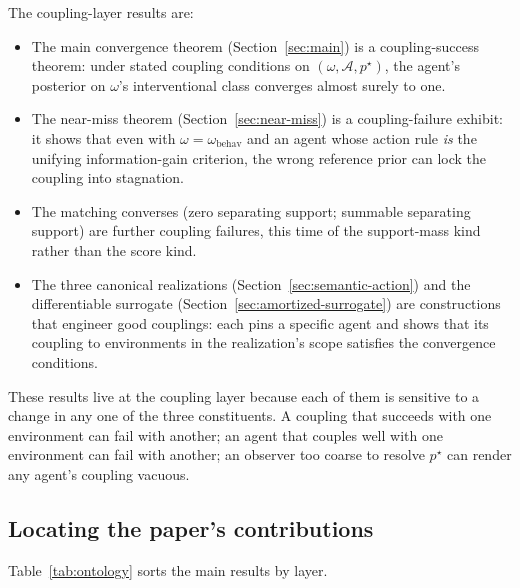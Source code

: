 \documentclass[11pt]{article}
\theoremstyle{definition}
\theoremstyle{remark}
\newcommand{\Acal}{\mathcal{A}}
\begin{document}
The coupling-layer results are:
\begin{itemize}
\item The main convergence theorem (Section~\ref{sec:main}) is a coupling-success theorem: under stated coupling conditions on $(\omega,\Acal,p^\star)$, the agent's posterior on $\omega$'s interventional class converges almost surely to one.
\item The near-miss theorem (Section~\ref{sec:near-miss}) is a coupling-failure exhibit: it shows that even with $\omega=\omega_{\mathrm{behav}}$ and an agent whose action rule \emph{is} the unifying information-gain criterion, the wrong reference prior can lock the coupling into stagnation.
\item The matching converses (zero separating support; summable separating support) are further coupling failures, this time of the support-mass kind rather than the score kind.
\item The three canonical realizations (Section~\ref{sec:semantic-action}) and the differentiable surrogate (Section~\ref{sec:amortized-surrogate}) are constructions that engineer good couplings: each pins a specific agent and shows that its coupling to environments in the realization's scope satisfies the convergence conditions.
\end{itemize}
These results live at the coupling layer because each of them is sensitive to a change in any one of the three constituents. A coupling that succeeds with one environment can fail with another; an agent that couples well with one environment can fail with another; an observer too coarse to resolve $p^\star$ can render any agent's coupling vacuous.

\subsection{Locating the paper's contributions}
\label{sec:ontology-locator}

Table~\ref{tab:ontology} sorts the main results by layer.
\end{document}
